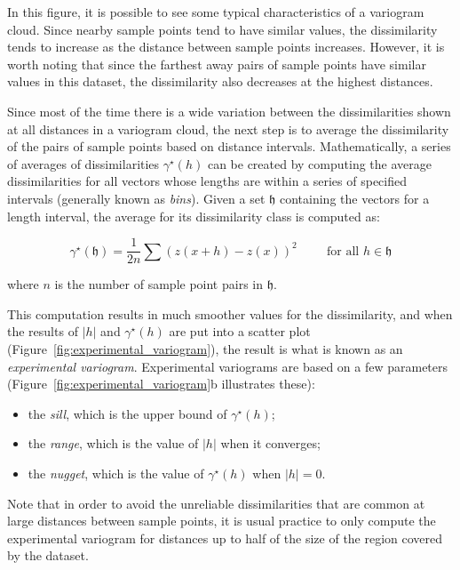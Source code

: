 In this figure, it is possible to see some typical characteristics of a variogram cloud.
Since nearby sample points tend to have similar values, the dissimilarity tends to increase as the distance between sample points increases.
However, it is worth noting that since the farthest away pairs of sample points have similar values in this dataset, the dissimilarity also decreases at the highest distances.

Since most of the time there is a wide variation between the dissimilarities shown at all distances in a variogram cloud, the next step is to average the dissimilarity of the pairs of sample points based on distance intervals.
Mathematically, a series of averages of dissimilarities \(\gamma^\star(h)\) can be created by computing the average dissimilarities for all vectors whose lengths are within a series of specified intervals (generally known as \emph{bins}).
Given a set \(\mathfrak{h}\) containing the vectors for a length interval, the average for its dissimilarity class is computed as:

\begin{equation}
\gamma^\star(\mathfrak{h}) = \frac{1}{2n}\sum\left(z\left(x+h\right)-z\left(x\right)\right)^2 \hspace{1cm}\text{for all } h \in \mathfrak{h}
\end{equation}

where \(n\) is the number of sample point pairs in \(\mathfrak{h}\).

This computation results in much smoother values for the dissimilarity, and when the results of \(|h|\) and \(\gamma^\star(h)\) are put into a scatter plot (Figure~\ref{fig:experimental_variogram}), the result is what is known as an \emph{experimental variogram}.
Experimental variograms are based on a few parameters (Figure~\ref{fig:experimental_variogram}b illustrates these): 
\begin{itemize}
  \item the \emph{sill}, which is the upper bound of \(\gamma^\star(h)\); 
  \item the \emph{range}, which is the value of \(|h|\) when it converges; 
  \item the \emph{nugget}, which is the value of \(\gamma^\star(h)\) when \(|h| = 0\).
\end{itemize}
Note that in order to avoid the unreliable dissimilarities that are common at large distances between sample points, it is usual practice to only compute the experimental variogram for distances up to half of the size of the region covered by the dataset.

